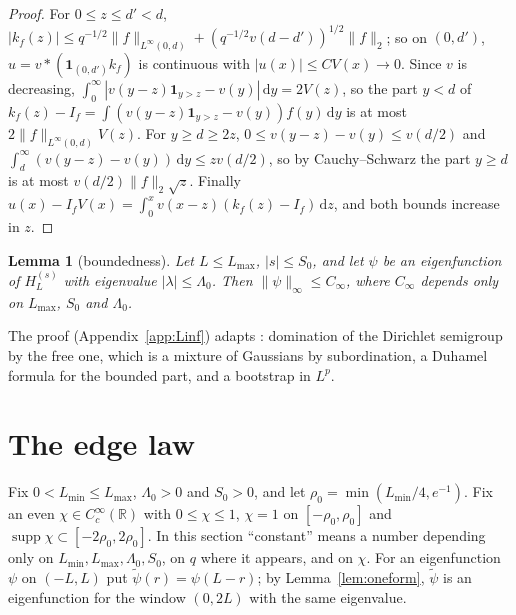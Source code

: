 \documentclass[11pt]{amsart}
\newcommand{\R}{\mathbb{R}}
\newcommand{\one}{\mathbf{1}}
\newcommand{\dd}{\,\mathrm{d}}
\DeclareMathOperator{\supp}{supp}
\newtheorem{lemma}[theorem]{Lemma}
\theoremstyle{definition}
\theoremstyle{remark}
\numberwithin{equation}{section}
\begin{document}
\begin{proof}
For $0\le z\le d'<d$, $|k_f(z)|\le q^{-1/2}\|f\|_{L^\infty(0,d)}+(q^{-1/2}v(d-d'))^{1/2}\|f\|_2$; so on $(0,d')$, $u=v*(\one_{(0,d')}k_f)$ is continuous with $|u(x)|\le CV(x)\to0$. Since $v$ is decreasing, $\int_0^\infty|v(y-z)\one_{y>z}-v(y)|\dd y=2V(z)$, so the part $y<d$ of $k_f(z)-I_f=\int(v(y-z)\one_{y>z}-v(y))f(y)\dd y$ is at most $2\|f\|_{L^\infty(0,d)}V(z)$. For $y\ge d\ge2z$, $0\le v(y-z)-v(y)\le v(d/2)$ and $\int_d^\infty(v(y-z)-v(y))\dd y\le zv(d/2)$, so by Cauchy--Schwarz the part $y\ge d$ is at most $v(d/2)\|f\|_2\sqrt z$. Finally $u(x)-I_fV(x)=\int_0^xv(x-z)(k_f(z)-I_f)\dd z$, and both bounds increase in $z$.
\end{proof}

\begin{lemma}[boundedness]\label{lem:Linf}
Let $L\le L_{\max}$, $|s|\le S_0$, and let $\psi$ be an eigenfunction of $H^{(s)}_L$ with eigenvalue $|\lambda|\le\Lambda_0$. Then $\|\psi\|_\infty\le C_\infty$, where $C_\infty$ depends only on $L_{\max}$, $S_0$ and $\Lambda_0$.
\end{lemma}

The proof (Appendix~\ref{app:Linf}) adapts \cite[App.~A]{BPL}: domination of the Dirichlet semigroup by the free one, which is a mixture of Gaussians by subordination, a Duhamel formula for the bounded part, and a bootstrap in $L^p$.

\section{The edge law}\label{sec:edge}

Fix $0<L_{\min}\le L_{\max}$, $\Lambda_0>0$ and $S_0>0$, and let $\rho_0=\min(L_{\min}/4,e^{-1})$. Fix an even $\chi\in C_c^\infty(\R)$ with $0\le\chi\le1$, $\chi=1$ on $[-\rho_0,\rho_0]$ and $\supp\chi\subset[-2\rho_0,2\rho_0]$. In this section ``constant'' means a number depending only on $L_{\min},L_{\max},\Lambda_0,S_0$, on $q$ where it appears, and on $\chi$. For an eigenfunction $\psi$ on $(-L,L)$ put $\tilde\psi(r)=\psi(L-r)$; by Lemma~\ref{lem:oneform}, $\tilde\psi$ is an eigenfunction for the window $(0,2L)$ with the same eigenvalue.
\end{document}
